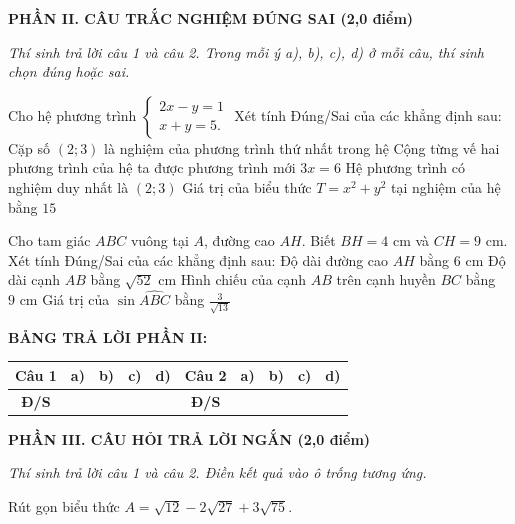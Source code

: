 \documentclass[12pt,a4paper]{article}
\begin{document}
\setcounter{ex}{0}
\noindent\textbf{\large PHẦN II. CÂU TRẮC NGHIỆM ĐÚNG SAI (2,0 điểm)}

\textit{Thí sinh trả lời câu 1 và câu 2. Trong mỗi ý a), b), c), d) ở mỗi câu, thí sinh chọn đúng hoặc sai.}

\vspace{1mm}
\begin{ex}
Cho hệ phương trình $\begin{cases} 2x - y = 1 \\ x + y = 5. \end{cases}$ Xét tính Đúng/Sai của các khẳng định sau:
\choiceTF
{\True Cặp số $(2; 3)$ là nghiệm của phương trình thứ nhất trong hệ}
{\True Cộng từng vế hai phương trình của hệ ta được phương trình mới $3x = 6$}
{\True Hệ phương trình có nghiệm duy nhất là $(2; 3)$}
{Giá trị của biểu thức $T = x^2 + y^2$ tại nghiệm của hệ bằng $15$}
\end{ex}

\begin{ex}
Cho tam giác $ABC$ vuông tại $A$, đường cao $AH$. Biết $BH = 4\text{ cm}$ và $CH = 9\text{ cm}$. Xét tính Đúng/Sai của các khẳng định sau:
\choiceTF
{\True Độ dài đường cao $AH$ bằng $6\text{ cm}$}
{\True Độ dài cạnh $AB$ bằng $\sqrt{52}\text{ cm}$}
{Hình chiếu của cạnh $AB$ trên cạnh huyền $BC$ bằng $9\text{ cm}$}
{\True Giá trị của $\sin \widehat{ABC}$ bằng $\frac{3}{\sqrt{13}}$}
\end{ex}


\noindent\textbf{BẢNG TRẢ LỜI PHẦN II:}
\begin{center}
\begin{tabular}{|c|c|c|c|c||c|c|c|c|c|}
\hline
\textbf{Câu 1} & \textbf{a)} & \textbf{b)} & \textbf{c)} & \textbf{d)} & \textbf{Câu 2} & \textbf{a)} & \textbf{b)} & \textbf{c)} & \textbf{d)} \\
\hline
\textbf{Đ/S} & \rule{0pt}{0.6cm} & & & & \textbf{Đ/S} & & & & \\
\hline
\end{tabular}
\end{center}
\vspace{2mm}

\setcounter{ex}{0}
\noindent\textbf{\large PHẦN III. CÂU HỎI TRẢ LỜI NGẮN (2,0 điểm)}

\textit{Thí sinh trả lời câu 1 và câu 2. Điền kết quả vào ô trống tương ứng.}

\vspace{1mm}
\begin{ex}
Rút gọn biểu thức $A = \sqrt{12} - 2\sqrt{27} + 3\sqrt{75}$. 
\end{ex}
\end{document}

